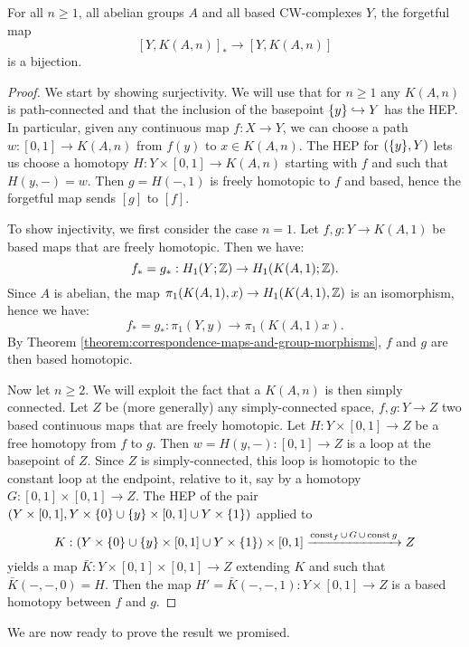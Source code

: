 \begin{lemma}
For all $n\ge1$, all abelian groups $A$ and all based CW-complexes $Y$, the forgetful map
\[[Y,K(A,n)]_*\to [Y,K(A,n)]\]
is a bijection.
\end{lemma}

\begin{proof}
We start by showing surjectivity. We will use that for $n\ge1$ any $K(A,n)$ is path-connected and that the inclusion of the basepoint $\{y\}\hookrightarrow Y$ has the HEP. In particular, given any continuous map $f:X\to Y$, we can choose a path $w:[0,1]\to K(A,n)$ from $f(y)$ to $x\in K(A,n)$. The HEP for $(\{y\},Y)$ lets us choose a homotopy $H:Y\times[0,1]\to K(A,n)$ starting with $f$ and such that $H(y,-)=w$. Then $g=H(-,1)$ is freely homotopic to $f$ and based, hence the forgetful map sends $[g]$ to $[f]$.

To show injectivity, we first consider the case $n=1$. Let $f,g:Y\to K(A,1)$ be based maps that are freely homotopic. Then we have:
\[f_*=g_*:H_1(Y;{\mathbb Z})\to H_1(K(A,1);{\mathbb Z}).\]
Since $A$ is abelian, the map $\pi_1(K(A,1),x)\to H_1(K(A,1),{\mathbb Z})$ is an isomorphism, hence we have:
\[f_*=g_*:\pi_1(Y,y)\to \pi_1(K(A,1)x).\]
By Theorem \ref{theorem:correspondence-maps-and-group-morphisms}, $f$ and $g$ are then based homotopic.

Now let $n\ge2$. We will exploit the fact that a $K(A,n)$ is then simply connected. Let $Z$ be (more generally) any simply-connected space, $f,g:Y\to Z$ two based continuous maps that are freely homotopic. Let $H:Y\times[0,1]\to Z$ be a free homotopy from $f$ to $g$. Then $w=H(y,-):[0,1]\to Z$ is a loop at the basepoint of $Z$. Since $Z$ is simply-connected, this loop is homotopic to the constant loop at the endpoint, relative to it, say by a homotopy $G:[0,1]\times[0,1]\to Z$. The HEP of the pair $(Y\times[0,1],Y\times\{0\}\cup\{y\}\times[0,1]\cup Y\times\{1\})$ applied to
\[K:(Y\times\{0\}\cup\{y\}\times[0,1]\cup Y\times\{1\})\times[0,1]\xrightarrow{\operatorname{const}_f\cup\,G\,\cup\, \operatorname{const} g} Z\]
yields a map $\bar K:Y\times[0,1]\times[0,1]\to Z$ extending $K$ and such that $\bar K(-,-,0)=H$. Then the map $H'=\bar K(-,-,1):Y\times[0,1]\to Z$ is a based homotopy between $f$ and $g$.
\end{proof}

We are now ready to prove the result we promised.

